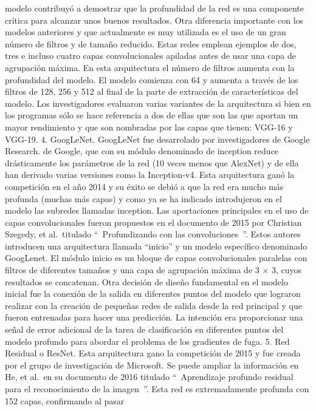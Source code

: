 \documentclass[
  a4paper,
  DIV=11,
  numbers=noendperiod]{scrreprt}
\begin{document}
modelo contribuyó a demostrar que la profundidad de la red es una
componente crítica para alcanzar unos buenos resultados. Otra diferencia
importante con los modelos anteriores y que actualmente es muy utilizada
es el uso de un gran número de filtros y de tamaño reducido. Estas redes
emplean ejemplos de dos, tres e incluso cuatro capas convolucionales
apiladas antes de usar una capa de agrupación máxima. En esta
arquitectura el número de filtros aumenta con la profundidad del modelo.
El modelo comienza con 64 y aumenta a través de los filtros de 128, 256
y 512 al final de la parte de extracción de características del modelo.
Los investigadores evaluaron varias variantes de la arquitectura si bien
en los programas sólo se hace referencia a dos de ellas que son las que
aportan un mayor rendimiento y que son nombradas por las capas que
tienen: VGG-16 y VGG-19. 4. GoogLeNet. GoogLeNet fue desarrolado por
investigadores de Google Research. de Google, que con su módulo
denominado de inception reduce drásticamente los parámetros de la red
(10 veces menos que AlexNet) y de ella han derivado varias versiones
como la Inception-v4. Esta arquitectura ganó la competición en el año
2014 y su éxito se debió a que la red era mucho más profunda (muchas más
capas) y como ya se ha indicado introdujeron en el modelo las subredes
llamadas inception. Las aportaciones principales en el uso de capas
convolucionales fueron propuestos en el documento de 2015 por Christian
Szegedy, et al.~titulado ``~Profundizando con las convoluciones~''.
Estos autores introducen una arquitectura llamada ``inicio'' y un modelo
específico denominado GoogLenet. El módulo inicio es un bloque de capas
convolucionales paralelas con filtros de diferentes tamaños y una capa
de agrupación máxima de 3 × 3, cuyos resultados se concatenan. Otra
decisión de diseño fundamental en el modelo inicial fue la conexión de
la salida en diferentes puntos del modelo que lograron realizar con la
creación de pequeñas redes de salida desde la red principal y que fueron
entrenadas para hacer una predicción. La intención era proporcionar una
señal de error adicional de la tarea de clasificación en diferentes
puntos del modelo profundo para abordar el problema de los gradientes de
fuga. 5. Red Residual o ResNet. Esta arquitectura gano la competición de
2015 y fue creada por el grupo de investigación de Microsoft. Se puede
ampliar la información en He, et al.~en su documento de 2016 titulado
``~Aprendizaje profundo residual para el reconocimiento de la imagen~''.
Esta red es extremadamente profunda con 152 capas, confirmando al pasar
\end{document}
